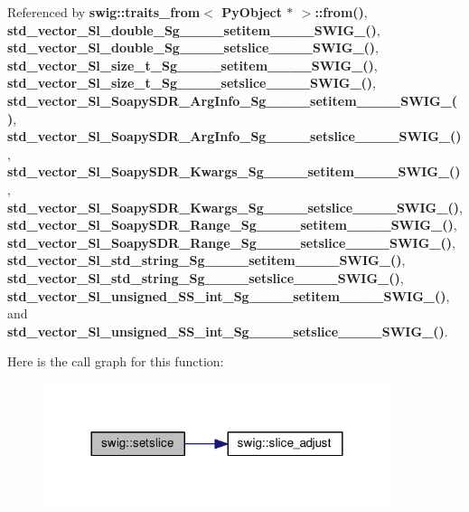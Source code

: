 Referenced by {\bf swig\+::traits\+\_\+from$<$ Py\+Object $\ast$ $>$\+::from()}, {\bf std\+\_\+vector\+\_\+\+Sl\+\_\+double\+\_\+\+Sg\+\_\+\+\_\+\+\_\+\+\_\+setitem\+\_\+\+\_\+\+\_\+\+\_\+\+S\+W\+I\+G\+\_()}, {\bf std\+\_\+vector\+\_\+\+Sl\+\_\+double\+\_\+\+Sg\+\_\+\+\_\+\+\_\+\+\_\+setslice\+\_\+\+\_\+\+\_\+\+\_\+\+S\+W\+I\+G\+\_()}, {\bf std\+\_\+vector\+\_\+\+Sl\+\_\+size\+\_\+t\+\_\+\+Sg\+\_\+\+\_\+\+\_\+\+\_\+setitem\+\_\+\+\_\+\+\_\+\+\_\+\+S\+W\+I\+G\+\_()}, {\bf std\+\_\+vector\+\_\+\+Sl\+\_\+size\+\_\+t\+\_\+\+Sg\+\_\+\+\_\+\+\_\+\+\_\+setslice\+\_\+\+\_\+\+\_\+\+\_\+\+S\+W\+I\+G\+\_()}, {\bf std\+\_\+vector\+\_\+\+Sl\+\_\+\+Soapy\+S\+D\+R\+\_\+\+Arg\+Info\+\_\+\+Sg\+\_\+\+\_\+\+\_\+\+\_\+setitem\+\_\+\+\_\+\+\_\+\+\_\+\+S\+W\+I\+G\+\_()}, {\bf std\+\_\+vector\+\_\+\+Sl\+\_\+\+Soapy\+S\+D\+R\+\_\+\+Arg\+Info\+\_\+\+Sg\+\_\+\+\_\+\+\_\+\+\_\+setslice\+\_\+\+\_\+\+\_\+\+\_\+\+S\+W\+I\+G\+\_()}, {\bf std\+\_\+vector\+\_\+\+Sl\+\_\+\+Soapy\+S\+D\+R\+\_\+\+Kwargs\+\_\+\+Sg\+\_\+\+\_\+\+\_\+\+\_\+setitem\+\_\+\+\_\+\+\_\+\+\_\+\+S\+W\+I\+G\+\_()}, {\bf std\+\_\+vector\+\_\+\+Sl\+\_\+\+Soapy\+S\+D\+R\+\_\+\+Kwargs\+\_\+\+Sg\+\_\+\+\_\+\+\_\+\+\_\+setslice\+\_\+\+\_\+\+\_\+\+\_\+\+S\+W\+I\+G\+\_()}, {\bf std\+\_\+vector\+\_\+\+Sl\+\_\+\+Soapy\+S\+D\+R\+\_\+\+Range\+\_\+\+Sg\+\_\+\+\_\+\+\_\+\+\_\+setitem\+\_\+\+\_\+\+\_\+\+\_\+\+S\+W\+I\+G\+\_()}, {\bf std\+\_\+vector\+\_\+\+Sl\+\_\+\+Soapy\+S\+D\+R\+\_\+\+Range\+\_\+\+Sg\+\_\+\+\_\+\+\_\+\+\_\+setslice\+\_\+\+\_\+\+\_\+\+\_\+\+S\+W\+I\+G\+\_()}, {\bf std\+\_\+vector\+\_\+\+Sl\+\_\+std\+\_\+string\+\_\+\+Sg\+\_\+\+\_\+\+\_\+\+\_\+setitem\+\_\+\+\_\+\+\_\+\+\_\+\+S\+W\+I\+G\+\_()}, {\bf std\+\_\+vector\+\_\+\+Sl\+\_\+std\+\_\+string\+\_\+\+Sg\+\_\+\+\_\+\+\_\+\+\_\+setslice\+\_\+\+\_\+\+\_\+\+\_\+\+S\+W\+I\+G\+\_()}, {\bf std\+\_\+vector\+\_\+\+Sl\+\_\+unsigned\+\_\+\+S\+S\+\_\+int\+\_\+\+Sg\+\_\+\+\_\+\+\_\+\+\_\+setitem\+\_\+\+\_\+\+\_\+\+\_\+\+S\+W\+I\+G\+\_()}, and {\bf std\+\_\+vector\+\_\+\+Sl\+\_\+unsigned\+\_\+\+S\+S\+\_\+int\+\_\+\+Sg\+\_\+\+\_\+\+\_\+\+\_\+setslice\+\_\+\+\_\+\+\_\+\+\_\+\+S\+W\+I\+G\+\_()}.



Here is the call graph for this function\+:
\nopagebreak
\begin{figure}[H]
\begin{center}
\leavevmode
\includegraphics[width=288pt]{d3/d99/namespaceswig_a697380d209f2d60ec96b1b461779d181_cgraph}
\end{center}
\end{figure}




